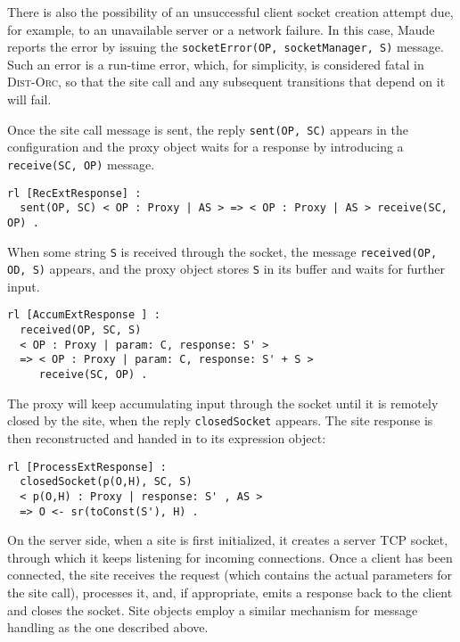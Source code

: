 \documentclass{eptcs}
\begin{document}
There is also the possibility of an unsuccessful client socket creation attempt due, for example, to an unavailable server or a network failure. In this case, Maude reports the error by issuing the \texttt{socketError(OP, socketManager, S)} message. Such an error is a run-time error, which, for simplicity, is considered fatal in \textsc{Dist-Orc}, so that the site call and any subsequent transitions that depend on it will fail.

Once the site call message is sent, the reply \texttt{sent(OP, SC)} appears in the configuration and the proxy object waits for a response by introducing a \texttt{receive(SC, OP)} message. 

\begin{small}
\begin{verbatim}
rl [RecExtResponse] :
  sent(OP, SC) < OP : Proxy | AS > => < OP : Proxy | AS > receive(SC, OP) .
\end{verbatim}
\end{small}


When some string \texttt{S} is received through the socket, the message \texttt{received(OP, OD, S)} appears, and the proxy object stores \texttt{S} in its buffer and waits for further input. 

\begin{small}
\begin{verbatim}
rl [AccumExtResponse ] :
  received(OP, SC, S) 
  < OP : Proxy | param: C, response: S' >
  => < OP : Proxy | param: C, response: S' + S > 
     receive(SC, OP) .
\end{verbatim}
\end{small}

The proxy will keep accumulating input through the socket until it is remotely closed by the site, when the reply \texttt{closedSocket} appears. The site response is then reconstructed and handed in to its expression object:

\begin{small}
\begin{verbatim}
rl [ProcessExtResponse] :
  closedSocket(p(O,H), SC, S) 
  < p(O,H) : Proxy | response: S' , AS >
  => O <- sr(toConst(S'), H) .
\end{verbatim}
\end{small}


 

On the server side, when a site is first initialized, it creates a server TCP socket, through which it keeps listening for incoming connections. Once a client has been connected, the site receives the request (which contains the actual parameters for the site call), processes it, and, if appropriate, emits a response back to the client and closes the socket. Site objects employ a similar mechanism for message handling as the one described above.
\end{document}
